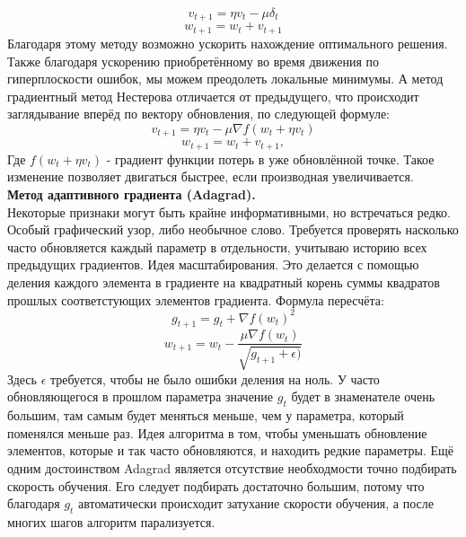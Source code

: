\documentclass[oneside,final,14pt]{extreport}
\begin{document}
\[v_{t+1} = \eta v_t - \mu  \delta_t\]
\[w_{t+1} = w_t + v_{t+1}\]
Благодаря этому методу возможно ускорить нахождение оптимального решения. Также благодаря ускорению приобретённому во время движения по гиперплоскости ошибок, мы можем преодолеть локальные минимумы. А метод градиентный метод Нестерова отличается от предыдущего, что происходит заглядывание вперёд по вектору обновления, по следующей формуле:
\[v_{t+1} = \eta v_t - \mu  \nabla f(w_t + \eta v_t)\]
\[w_{t+1} = w_t + v_{t+1},\]
Где \(f(w_t + \eta v_t)\) - градиент функции потерь в уже обновлённой точке.
Такое изменение позволяет двигаться быстрее, если производная увеличивается. \\
\textbf{Метод адаптивного градиента (Adagrad).\cite{bib:Adagrad}}\\
Некоторые признаки могут быть крайне информативными, но встречаться редко. Особый графический узор, либо необычное слово. Требуется проверять насколько часто обновляется каждый параметр в отдельности, учитываю историю всех предыдущих градиентов. Идея масштабирования. Это делается с помощью деления каждого элемента в градиенте на квадратный корень суммы квадратов прошлых соответстующих элементов градиента. Формула пересчёта:
\[g_{t+1} = g_t + \nabla f(w_t)^2 \]
\[w_{t+1} = w_t - \frac{\mu \nabla f(w_t) }{\sqrt{g_{t+1} + \epsilon)} }  \] 
Здесь \(\epsilon\) требуется, чтобы не было ошибки деления на ноль. У часто обновляющегося в прошлом параметра значение \(g_t \) будет в знаменателе очень большим, там самым будет меняться меньше, чем у параметра, который поменялся меньше раз. Идея алгоритма в том, чтобы уменьшать обновление элементов, которые и так часто обновляются, и находить редкие параметры. Ещё одним достоинством Adagrad  является отсутствие необходмости точно подбирать скорость обучения. Его следует подбирать достаточно большим, потому что благодаря \(g_t\) автоматически происходит затухание скорости обучения, а после многих шагов алгоритм парализуется.
\end{document}
